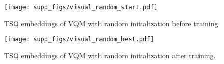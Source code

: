 \documentclass[runningheads]{llncs}
\begin{document}
\begin{figure}[t] \centering \texttt{[image: supp\_figs/visual\_random\_start.pdf]} \caption{TSQ embeddings of VQM with random  initialization before training.} \label{Fig.vis_random_start} \end{figure}


\begin{figure}[t] \centering \texttt{[image: supp\_figs/visual\_random\_best.pdf]} \caption{TSQ embeddings of VQM with random  initialization after training.} \label{Fig.vis_random_best} \end{figure} 



\clearpage


\end{document}
